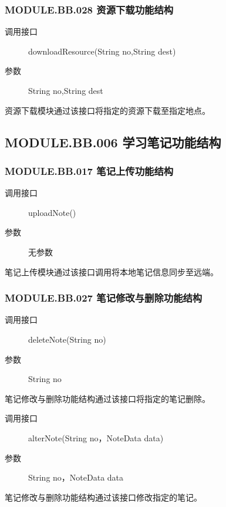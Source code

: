   \subsubsection{MODULE.BB.028 资源下载功能结构}
  \begin{description}
    \item[调用接口]downloadResource(String no,String dest)
    \item[参数]String no,String dest
  \end{description}
  资源下载模块通过该接口将指定的资源下载至指定地点。

\subsection{MODULE.BB.006 学习笔记功能结构}
  \subsubsection{MODULE.BB.017 笔记上传功能结构}
  \begin{description}
    \item[调用接口]uploadNote()
    \item[参数]无参数
  \end{description}
  笔记上传模块通过该接口调用将本地笔记信息同步至远端。
  \subsubsection{MODULE.BB.027 笔记修改与删除功能结构}
  \begin{description}
    \item[调用接口]deleteNote(String no)
    \item[参数]String no
  \end{description}
  笔记修改与删除功能结构通过该接口将指定的笔记删除。
  \begin{description}
    \item[调用接口]alterNote(String no，NoteData data)
    \item[参数]String no，NoteData data
  \end{description}
  笔记修改与删除功能结构通过该接口修改指定的笔记。
